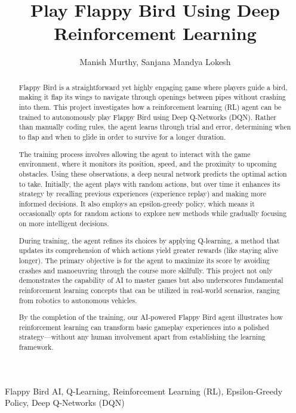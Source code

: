 \documentclass[12pt]{article}
\title{Play Flappy Bird Using Deep Reinforcement Learning}
\author{Manish Murthy, Sanjana Mandya Lokesh}
\date{}
\begin{document}
\maketitle

\begin{abstract}
Flappy Bird is a straightforward yet highly engaging game where players guide a bird, making it flap its wings to navigate through openings between pipes without crashing into them. This project investigates how a reinforcement learning (RL) agent can be trained to autonomously play Flappy Bird using Deep Q-Networks (DQN). Rather than manually coding rules, the agent learns through trial and error, determining when to flap and when to glide in order to survive for a longer duration.

The training process involves allowing the agent to interact with the game environment, where it monitors its position, speed, and the proximity to upcoming obstacles. Using these observations, a deep neural network predicts the optimal action to take. Initially, the agent plays with random actions, but over time it enhances its strategy by recalling previous experiences (experience replay) and making more informed decisions. It also employs an epsilon-greedy policy, which means it occasionally opts for random actions to explore new methods while gradually focusing on more intelligent decisions.

During training, the agent refines its choices by applying Q-learning, a method that updates its comprehension of which actions yield greater rewards (like staying alive longer). The primary objective is for the agent to maximize its score by avoiding crashes and manoeuvring through the course more skilfully. This project not only demonstrates the capability of AI to master games but also underscores fundamental reinforcement learning concepts that can be utilized in real-world scenarios, ranging from robotics to autonomous vehicles.

By the completion of the training, our AI-powered Flappy Bird agent illustrates how reinforcement learning can transform basic gameplay experiences into a polished strategy—without any human involvement apart from establishing the learning framework.
\end{abstract}

\begin{keywords}
Flappy Bird AI, Q-Learning, Reinforcement Learning (RL), Epsilon-Greedy Policy, Deep Q-Networks (DQN)
\end{keywords}
\end{document}
